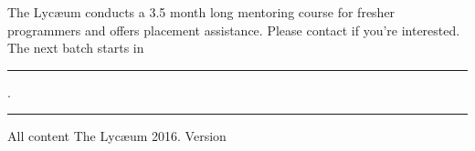 \documentclass{../refsheet}
\begin{document}
The Lyc\ae{}um conducts a 3.5 month long mentoring course for fresher
programmers and offers placement assistance. Please contact if you're
interested. The next batch starts in \rule{4cm}{0.1ex}.

    \textcolor{lightgray}{\noindent\rule{\linewidth}{0.05ex}}
\footnotesize All content \textcopyright The Lyc\ae{}um 2016. Version 
\end{document}
